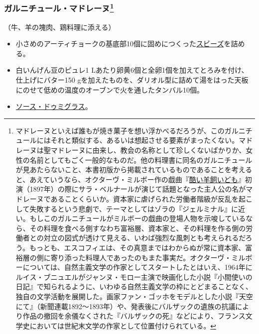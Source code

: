 \begin{recette}
\hypertarget{garniture-madeleine}{%
\subsubsection[ガルニチュール・マドレーヌ]{\texorpdfstring{ガルニチュール・マドレーヌ\footnote{マドレーヌといえば誰もが焼き菓子を想い浮かべるだろうが、このガルニチュールにはそれと類似する、あるいは想起させる要素がまったくない。マドレーヌは聖マドレーヌに由来し、教会の名称として珍しくないばかりか、女性の名前としてもごく一般的なものだ。他の料理書に同名のガルニチュールが見あたらないこと、本書初版から掲載されているものであることを考えると、あえていうなら、オクターヴ・ミルボー作の戯曲『\href{http://gallica.bnf.fr/ark:/12148/bpt6k203007v}{酷い羊飼いども}』初演（1897年）の際にサラ・ベルナールが演じて話題となった主人公の名がマドレーヌであることくらいか。資本家に虐げられた労働者階級が反乱を起こして失敗するという悲劇で、テーマとしてはゾラの『ジェルミナル』に近い。もしこのガルニチュールがミルボーの戯曲の登場人物を示唆しているなら、その料理を食べる側すなわち富裕層、資本家と、その料理を作る側の労働者との対立の図式が透けて見える、いわば強烈な風刺とも考えられるだろう。もっとも、エスコフィエは、その真意まではわからぬが常に資本家、富裕層の側に寄り添った料理人であったのもまた事実だ。オクターヴ・ミルボーについては、自然主義文学の作家としてスタートしたとはいえ、1964年にルイス・ブニュエルがジャンヌ・モロー主演で映画化した小説『小間使いの日記』で知られるように、いわゆる自然主義文学の枠にとどまることなく、独自の文学活動を展開した。画家ファン・ゴッホをモデルとした小説『天空にて』（新聞連載1892〜1893年）や、発表後にバルザックの遺族の抗議により作品の撤回を余儀なくされた『バルザックの死』などにより、フランス文学史においては世紀末文学の作家として位置付けられている。}}{ガルニチュール・マドレーヌ}}\label{garniture-madeleine}}



（牛、羊の塊肉、鶏料理に添える）

\begin{itemize}
\item
  小さめのアーティチョークの基底部10個に固めにつくった\protect\hyperlink{sauce-soubise}{スビーズ}を詰める。
\item
  白いんげん豆のピュレ1
  Lあたり卵黄6個と全卵1個を加えてとろみを付け、仕上げにバター150
  gを加えたものを、ダリオル型に詰めて湯をはった天板にのせて低めの温度のオーブンで火を通したタンバル10個。
\item
  \protect\hyperlink{sauce-demi-glace}{ソース・ドゥミグラス}。
\end{itemize}


\end{recette}
